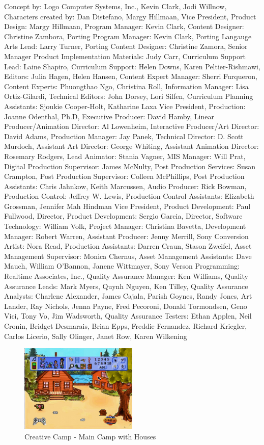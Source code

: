 Concept by: Logo Computer Systems, Inc., Kevin Clark, Jodi Willnow,
Characters created by: Dan Distefano, Margy Hillmaan,
Vice President, Product Design: Margy Hillmaan,
Program Manager: Kevin Clark,
Content Designer: Christine Zambora,
Porting Program Manager: Kevin Clark,
Porting Langauge Arts Lead: Larry Turner,
Porting Content Designer: Christine Zamora,
Senior Manager Product Implementation Materials: Judy Carr,
Curriculum Support Lead: Laine Shapiro,
Curriculum Support: Helen Downs, Karen Peltier-Rishmawi,
Editors: Julia Hagen, Helen Hansen,
Content Expert Manager: Sherri Furqueron,
Content Experts: Phuongthao Ngo, Christina Roll,
Information Manager: Lisa Ortiz-Gilardi,
Technical Editors: John Dorsey, Lori Silfen,
Curriculum Planning Assistants: Sjoukie Cooper-Holt, Katharine Laxa
Vice President, Production: Joanne Odenthal, Ph.D,
Executive Producer: David Hamby,
Linear Producer/Animation Director: Al Lowenheim,
Interactive Producer/Art Director: David Adams,
Production Manager: Jay Panek,
Technical Director: D. Scott Murdoch,
Assistant Art Director: George Whiting,
Assistant Animation Director: Rosemary Rodgers,
Lead Animator: Stania Vagner,
MIS Manager: Will Prat,
Digital Production Supervisor: James McNulty,
Post Production Services: Susan Crampton,
Post Production Supervisor: Colleen McPhillips,
Post Production Assistants: Chris Jahnkow, Keith Marcussen,
Audio Producer: Rick Bowman,
Production Control: Jeffrey W. Lewis,
Production Control Assistants: Elizabeth Grossman, Jennifer Mah Hindman
Vice President, Product Development: Paul Fullwood,
Director, Product Development: Sergio Garcia,
Director, Software Technology: William Volk,
Project Manager: Christina Bavetta,
Development Manager: Robert Warren,
Assistant Producer: Jenny Merrill,
Sony Conversion Artist: Nora Read,
Production Assistants: Darren Craun, Stason Zweifel,
Asset Management Supervisor: Monica Chernus,
Asset Management Assistants: Dave Mauch, William O'Bannon, Janene Wittmayer,
Sony Verson Programming: Realtime Associates, Inc.,
Quality Assurance Manager: Ken Williams,
Quality Assurance Leads: Mark Myers, Quynh Nguyen, Ken Tilley,
Quality Assurance Analysts: Charlene Alexander, James Cajala, Parish Goynes, Randy Jones, Art Lander, Ray Nichols, Jenna Payne, Fred Pecoroni, Donald Tormondsen, Geno Vici, Tony Vo, Jim Wadsworth,
Quality Assurance Testers: Ethan Applen, Neil Cronin, Bridget Desmarais, Brian Epps, Freddie Fernandez, Richard Kriegler, Carlos Licerio, Sally Olinger, Janet Row, Karen Wilkening

\begin{figure}[H]
    \centering
    \includegraphics[width=0.5\textwidth]{"./Games/Creative/Images/CreativeCampScreenshot1.jpg"}
    \caption{Creative Camp - Main Camp with Houses}
\end{figure}

